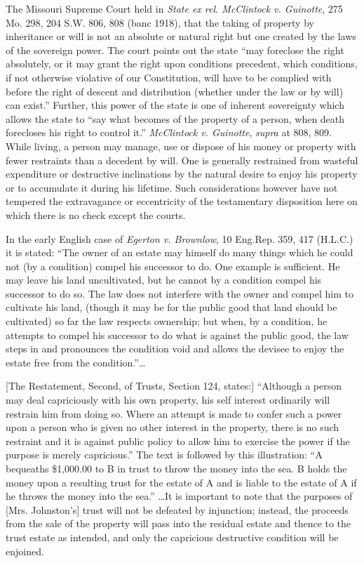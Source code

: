 The Missouri Supreme Court held in \textit{State ex rel. McClintock v.
Guinotte}, 275 Mo. 298, 204 S.W. 806, 808 (banc 1918), that the taking of
property by inheritance or will is not an absolute or natural right but one
created by the laws of the sovereign power. The court points out the state
``may foreclose the right absolutely, or it may grant the right upon conditions
precedent, which conditions, if not otherwise violative of our Constitution,
will have to be complied with before the right of descent and distribution
(whether under the law or by will) can exist.'' Further, this power of the
state is one of inherent sovereignty which allows the state to ``say what
becomes of the property of a person, when death forecloses his right to control
it.'' \textit{McClintock v. Guinotte}, \textit{supra} at 808, 809. While
living, a person may manage, use or dispose of his money or property with fewer
restraints than a decedent by will. One is generally restrained from wasteful
expenditure or destructive inclinations by the natural desire to enjoy his
property or to accumulate it during his lifetime. Such considerations however
have not tempered the extravagance or eccentricity of the testamentary
disposition here on which there is no check except the courts.

In the early English case of \textit{Egerton v. Brownlow}, 10 Eng.Rep. 359, 417
(H.L.C.) it is stated: ``The owner of an estate may himself do many things which
he could not (by a condition) compel his successor to do. One example is
sufficient. He may leave his land uncultivated, but he cannot by a condition
compel his successor to do so. The law does not interfere with the owner and
compel him to cultivate his land, (though it may be for the public good that
land should be cultivated) so far the law respects ownership; but when, by a
condition, he attempts to compel his successor to do what is against the public
good, the law steps in and pronounces the condition void and allows the devisee
to enjoy the estate free from the condition.''\ldots 

[The Restatement, Second, of Trusts, Section 124, states:] ``Although a person
may deal capriciously with his own property, his self interest ordinarily will
restrain him from doing so. Where an attempt is made to confer such a power
upon a person who is given no other interest in the property, there is no such
restraint and it is against public policy to allow him to exercise the power if
the purpose is merely capricious.'' The text is followed by this illustration:
``A bequeaths \$1,000.00 to B in trust to throw the money into the sea. B holds
the money upon a resulting trust for the estate of A and is liable to the
estate of A if he throws the money into the sea.'' \ldots It is important to
note that the purposes of [Mrs. Johnston's] trust will not be defeated by
injunction; instead, the proceeds from the sale of the property will pass into
the residual estate and thence to the trust estate as intended, and only the
capricious destructive condition will be enjoined.

